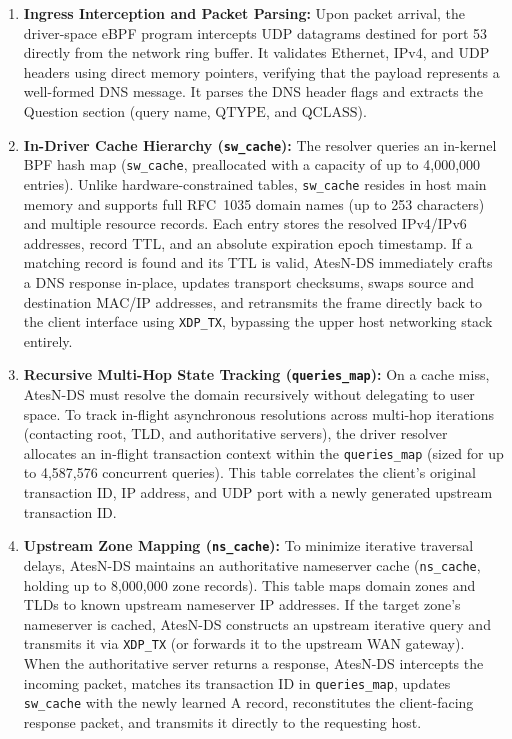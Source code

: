 \documentclass[a4paper,fleqn,colorlinks,hidelinks]{cas-sc}
\begin{document}
\begin{enumerate}
    \item \textbf{Ingress Interception and Packet Parsing:} Upon packet arrival, the driver-space eBPF program intercepts UDP datagrams destined for port 53 directly from the network ring buffer. It validates Ethernet, IPv4, and UDP headers using direct memory pointers, verifying that the payload represents a well-formed DNS message. It parses the DNS header flags and extracts the Question section (query name, $\text{QTYPE}$, and $\text{QCLASS}$).
    \item \textbf{In-Driver Cache Hierarchy (\texttt{sw\_cache}):} The resolver queries an in-kernel BPF hash map (\texttt{sw\_cache}, preallocated with a capacity of up to 4,000,000 entries). Unlike hardware-constrained tables, \texttt{sw\_cache} resides in host main memory and supports full RFC~1035 domain names (up to 253 characters) and multiple resource records. Each entry stores the resolved IPv4/IPv6 addresses, record TTL, and an absolute expiration epoch timestamp. If a matching record is found and its TTL is valid, AtesN-DS immediately crafts a DNS response in-place, updates transport checksums, swaps source and destination MAC/IP addresses, and retransmits the frame directly back to the client interface using \texttt{XDP\_TX}, bypassing the upper host networking stack entirely.
    \item \textbf{Recursive Multi-Hop State Tracking (\texttt{queries\_map}):} On a cache miss, AtesN-DS must resolve the domain recursively without delegating to user space. To track in-flight asynchronous resolutions across multi-hop iterations (contacting root, TLD, and authoritative servers), the driver resolver allocates an in-flight transaction context within the \texttt{queries\_map} (sized for up to 4,587,576 concurrent queries). This table correlates the client's original transaction ID, IP address, and UDP port with a newly generated upstream transaction ID.
    \item \textbf{Upstream Zone Mapping (\texttt{ns\_cache}):} To minimize iterative traversal delays, AtesN-DS maintains an authoritative nameserver cache (\texttt{ns\_cache}, holding up to 8,000,000 zone records). This table maps domain zones and TLDs to known upstream nameserver IP addresses. If the target zone's nameserver is cached, AtesN-DS constructs an upstream iterative query and transmits it via \texttt{XDP\_TX} (or forwards it to the upstream WAN gateway). When the authoritative server returns a response, AtesN-DS intercepts the incoming packet, matches its transaction ID in \texttt{queries\_map}, updates \texttt{sw\_cache} with the newly learned A record, reconstitutes the client-facing response packet, and transmits it directly to the requesting host.

\end{enumerate}
\end{document}
